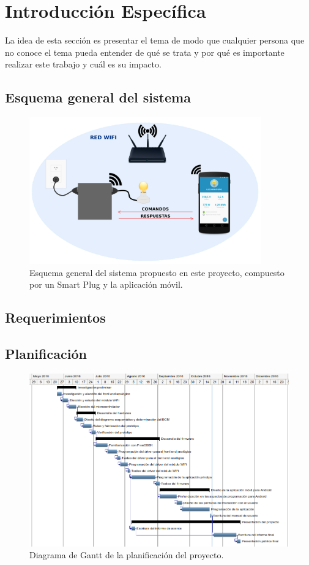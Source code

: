 \chapter{Introducción Específica} %

\label{Chapter2}

La idea de esta sección es presentar el tema de modo que cualquier persona que no conoce el tema pueda entender de qué se trata y por qué es importante realizar este trabajo y cuál es su impacto.
\section{Esquema general del sistema}

\begin{figure}[h]
	\centering
	\includegraphics[width=10cm]{./Figures/2_1_esquema_sistema.png}
	\caption{Esquema general del sistema propuesto en este proyecto, compuesto por un Smart Plug y la aplicación móvil.}
	\label{fig:esquema_sistema}
\end{figure}

\section{Requerimientos}

\section{Planificación}

\begin{figure}[h]
	\centering
	\includegraphics[width=20cm, angle=90]{./Figures/2_3_diagrama-Gantt.png}
	\caption{Diagrama de Gantt de la planificación del proyecto.}
	\label{fig:diagrama_gantt}
\end{figure}
